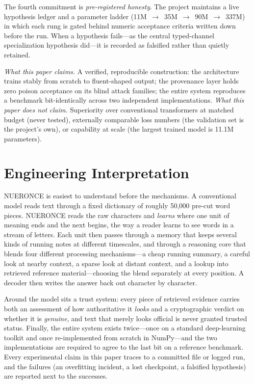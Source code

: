 \documentclass[journal]{IEEEtran}
\begin{document}
The fourth commitment is \emph{pre-registered honesty}. The project maintains a live hypothesis ledger and a parameter ladder (11M~$\to$~35M~$\to$~90M~$\to$~337M) in which each rung is gated behind numeric acceptance criteria written down before the run. When a hypothesis fails---as the central typed-channel specialization hypothesis did---it is recorded as falsified rather than quietly retained.

\textit{What this paper claims.} A verified, reproducible construction: the architecture trains stably from scratch to fluent-shaped output; the provenance layer holds zero poison acceptance on its blind attack families; the entire system reproduces a benchmark bit-identically across two independent implementations. \textit{What this paper does not claim.} Superiority over conventional transformers at matched budget (never tested), externally comparable loss numbers (the validation set is the project's own), or capability at scale (the largest trained model is 11.1M parameters).

\section{Engineering Interpretation}
NUERONCE is easiest to understand before the mechanisms. A conventional model reads text through a fixed dictionary of roughly 50{,}000 pre-cut word pieces. NUERONCE reads the raw characters and \emph{learns} where one unit of meaning ends and the next begins, the way a reader learns to see words in a stream of letters. Each unit then passes through a memory that keeps several kinds of running notes at different timescales, and through a reasoning core that blends four different processing mechanisms---a cheap running summary, a careful look at nearby context, a sparse look at distant context, and a lookup into retrieved reference material---choosing the blend separately at every position. A decoder then writes the answer back out character by character.

Around the model sits a trust system: every piece of retrieved evidence carries both an assessment of how authoritative it \emph{looks} and a cryptographic verdict on whether it is \emph{genuine}, and text that merely looks official is never granted trusted status. Finally, the entire system exists twice---once on a standard deep-learning toolkit and once re-implemented from scratch in NumPy---and the two implementations are required to agree to the last bit on a reference benchmark. Every experimental claim in this paper traces to a committed file or logged run, and the failures (an overfitting incident, a lost checkpoint, a falsified hypothesis) are reported next to the successes.
\end{document}
